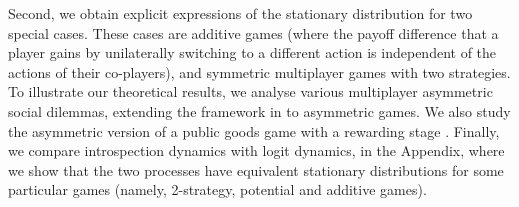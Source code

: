 \documentclass[11pt]{article}
\theoremstyle{plainCl1}
\theoremstyle{plainCl2}
\begin{document}
Second, we obtain explicit expressions of the stationary distribution for two special cases. These cases are additive games (where the payoff difference that a player gains by unilaterally switching to a different action is independent of the actions of their co-players), and symmetric multiplayer games with two strategies. 
To illustrate our theoretical results, we analyse various multiplayer asymmetric social dilemmas, extending the framework in \cite{Hauert:JTB:2006a} to asymmetric games. We also study the asymmetric version of a public goods game with a rewarding stage \cite{Pal:NatCom:2022}. Finally, we compare introspection dynamics with logit dynamics, in the Appendix, where we show that the two processes have equivalent stationary distributions for some particular games (namely, 2-strategy, potential and additive games).
\end{document}
